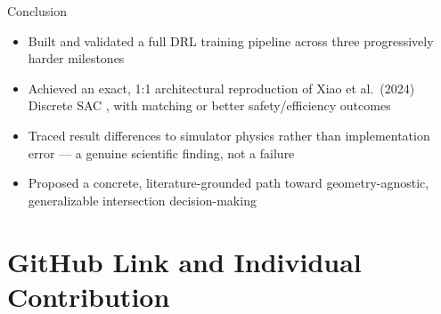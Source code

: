 \documentclass[aspectratio=169,10pt]{beamer}
\begin{document}

\begin{frame}{Conclusion}
    \begin{itemize}
        \item Built and validated a full DRL training pipeline across three progressively harder milestones
        \item Achieved an exact, 1:1 architectural reproduction of Xiao et al.\ (2024) Discrete SAC \cite{xiao2024decision}, with matching or better safety/efficiency outcomes
        \item Traced result differences to simulator physics rather than implementation error --- a genuine scientific finding, not a failure
        \item Proposed a concrete, literature-grounded path toward \alert{geometry-agnostic, generalizable} intersection decision-making
    \end{itemize}
\end{frame}

\section{GitHub Link and Individual Contribution}
\end{document}

